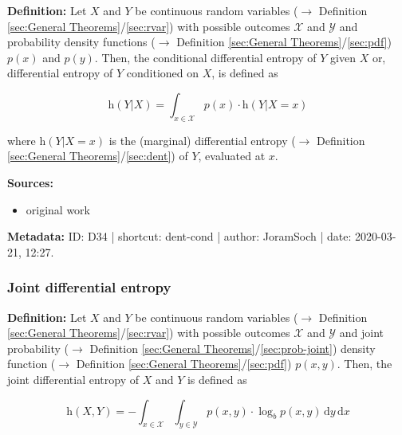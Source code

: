 \documentclass[a4paper,12pt,twoside]{book}
\begin{document}
\textbf{Definition:} Let $X$ and $Y$ be continuous random variables ($\rightarrow$ Definition \ref{sec:General Theorems}/\ref{sec:rvar}) with possible outcomes $\mathcal{X}$ and $\mathcal{Y}$ and probability density functions ($\rightarrow$ Definition \ref{sec:General Theorems}/\ref{sec:pdf}) $p(x)$ and $p(y)$. Then, the conditional differential entropy of $Y$ given $X$ or, differential entropy of $Y$ conditioned on $X$, is defined as

\begin{equation} \label{eq:dent-cond-dent-cond}
\mathrm{h}(Y|X) = \int_{x \in \mathcal{X}} p(x) \cdot \mathrm{h}(Y|X=x)
\end{equation}

where $\mathrm{h}(Y \vert X=x)$ is the (marginal) differential entropy ($\rightarrow$ Definition \ref{sec:General Theorems}/\ref{sec:dent}) of $Y$, evaluated at $x$.


\vspace{1em}
\textbf{Sources:}
\begin{itemize}
\item original work\end{itemize}


\vspace{1em}
\textbf{Metadata:} ID: D34 | shortcut: dent-cond | author: JoramSoch | date: 2020-03-21, 12:27.
\vspace{1em}



\subsubsection[\textit{Joint differential entropy}]{Joint differential entropy} \label{sec:dent-joint}
\setcounter{equation}{0}

\textbf{Definition:} Let $X$ and $Y$ be continuous random variables ($\rightarrow$ Definition \ref{sec:General Theorems}/\ref{sec:rvar}) with possible outcomes $\mathcal{X}$ and $\mathcal{Y}$ and joint probability ($\rightarrow$ Definition \ref{sec:General Theorems}/\ref{sec:prob-joint}) density function ($\rightarrow$ Definition \ref{sec:General Theorems}/\ref{sec:pdf}) $p(x,y)$. Then, the joint differential entropy of $X$ and $Y$ is defined as

\begin{equation} \label{eq:dent-joint-dent-joint}
\mathrm{h}(X,Y) = - \int_{x \in \mathcal{X}} \int_{y \in \mathcal{Y}} p(x,y) \cdot \log_b p(x,y) \, \mathrm{d}y \, \mathrm{d}x
\end{equation}
\end{document}
